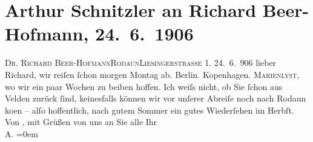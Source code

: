 

         
         \renewcommand{\erwaehntePersonen}{Personen: Richard Beer-Hofmann}
         \renewcommand{\erwaehnteOrte}{Orte: Berlin, IX., Alsergrund, Kopenhagen, Liesingerstraße, Marienlyst, Rodaun, Velden am Wörthersee, Wien}
         \renewcommand{\erwaehnteWerke}{}
               \section[Arthur Schnitzler an Richard Beer-Hofmann, 24. 6. 1906]{ Arthur Schnitzler an Richard Beer-Hofmann, 24. 6. 1906}\nopagebreak{}\rehead{ }\begin{ledgroupsized}[t]{13cm}\normalsize\beginnumbering \toendnotes[C]{\smallbreak\pagebreak[2]} 
\pstart{}{\pb}\textsc{Dr. Richard Beer-Hofmann}\pend{}\pstart{}\textsc{Rodaun}\pend{}\pstart{}\textsc{Liesingerstraße} 1.\pend{}{\bigskip}\pstart
           \raggedleft{}{\pb}24. 6. 906\pend
           \pstart{}lieber Richard, \pend\pstart
           wir reiſen ſchon morgen Montag ab. Berlin. Kopenhagen. \textsc{Marienlyst}, wo wir ein paar Wochen zu beiben hoffen. Ich weiſs nicht, ob Sie ſchon aus Velden zurück ſind, keinesfalls können wir vor
               unſerer Abreiſe noch nach Rodaun ko{\geminationm}en – alſo hoffentlich, nach gutem Sommer ein gutes
               Wiederſehen im Herbſt. \pend
           \pstart
           Von \damage{\textcolor{gray}{Herzen}}, mit Grüßen von uns an Sie alle\pend
           \pstart
           Ihr{\\[\baselineskip]}\spacefill\mbox{A.}\pend
           \leftskip=0em{}
         
         \endnumbering{}\end{ledgroupsized}  \newcommand{\dateiname}{L01603}\newcommand{\titel}{Arthur Schnitzler an Richard Beer-Hofmann, 24. 6. 1906}\newcommand{\editorInnen}{Martin Anton Müller und Gerd-Hermann Susen}
      